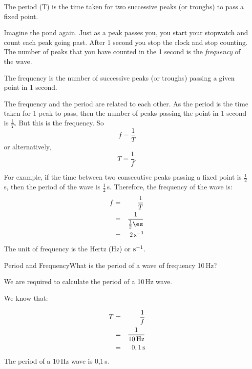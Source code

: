 \begin{definition}
 { \label{m38806*meaningfhsst!!!underscore!!!id426}The period ($\mathrm{T}$) is the time taken for two successive peaks (or troughs) to pass a fixed point.
         } 


\label{m38806*id319238}Imagine the pond again. Just as a peak passes you, you start your stopwatch and count each peak going past. After 1 second you stop the clock and stop counting. The number of peaks that you have counted in the 1 second is the \textsl{frequency} of the wave.\par 

 { \label{m38806*meaningfhsst!!!underscore!!!id430}
        The frequency is the number of successive peaks (or troughs) passing a given point in 1 second.
         } 
        
The frequency and the period are related to each other. As the period is the time taken for 1 peak to pass, then the number of peaks passing the point in 1 second is $\frac{1}{T}$. But this is the frequency. So
\begin{equation*}
f=\frac{1}{T}
\end{equation*}
or alternatively,
\begin{equation*}
T=\frac{1}{f}.
\end{equation*}

For example, if the time between two consecutive peaks passing a fixed point is $\frac{1}{2}\,$s, then the period of the wave is $\frac{1}{2}\,$s. Therefore, the frequency of the wave is:
\begin{eqnarray*}
f&=&\frac{1}{T}\\
&=&\frac{1}{\frac{1}{2}\es}\\
&=&2\,\mathrm{s^{-1}}
\end{eqnarray*}
The unit of frequency is the Hertz (Hz) or $\rm{s}^{-1}$.


\begin{wex}{Period and Frequency}{What is the period of a wave of frequency 10\,Hz?}{
We are required to calculate the period of a 10\,Hz wave.

We know that:

\begin{eqnarray*}
T&=&\frac{1}{f}\\
&=&\frac{1}{10\,\rm{Hz}}\\
&=&0,1\,\rm{s}
\end{eqnarray*}
The period of a 10\,Hz wave is 0,1\,s.}
\end{wex}


\end{definition}
